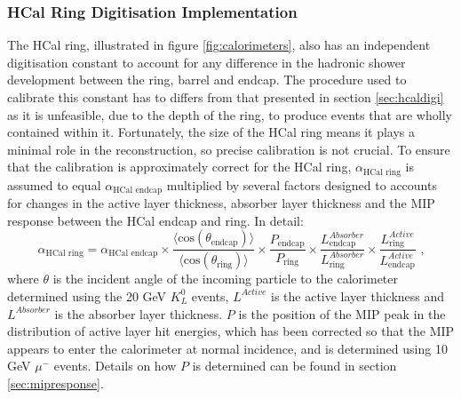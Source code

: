 \subsubsection{HCal Ring Digitisation Implementation}
\label{sec:hcalringdigi}
The HCal ring, illustrated in figure \ref{fig:calorimeters}, also has an independent digitisation constant to account for any difference in the hadronic shower development between the ring, barrel and endcap.  The procedure used to calibrate this constant has to differs from that presented in section \ref{sec:hcaldigi} as it is unfeasible, due to the depth of the ring, to produce events that are wholly contained within it.  Fortunately, the size of the HCal ring means it plays a minimal role in the reconstruction, so precise calibration is not crucial.  To ensure that the calibration is approximately correct for the HCal ring, $\alpha_{\text{HCal ring}}$ is assumed to equal $\alpha_{\text{HCal endcap}}$ multiplied by several factors designed to accounts for changes in the active layer thickness, absorber layer thickness and the MIP response between the HCal endcap and ring.  In detail:
%
\begin{equation}
\alpha_{\text{HCal ring}} = \alpha_{\text{HCal endcap}} \times \frac{\langle \text{cos}(\theta_\text{endcap}) \rangle}{\langle \text{cos}(\theta_\text{ring}) \rangle} \times \frac{P_\text{endcap} }{P_\text{ring} } \times \frac{L^{Absorber}_\text{endcap}}{L^{Absorber}_\text{ring} } \times \frac{L^{Active}_\text{ring}}{L^{Active}_\text{endcap}} \text{ ,}
\end{equation}
%
\noindent where $\theta$ is the incident angle of the incoming particle to the calorimeter determined using the 20 GeV $K^{0}_{L}$ events, $L^{Active}$ is the active layer thickness and $L^{Absorber}$ is the absorber layer thickness. $P$ is the position of the MIP peak in the distribution of active layer hit energies, which has been corrected so that the MIP appears to enter the calorimeter at normal incidence, and is determined using 10 GeV $\mu^{-}$ events.  Details on how $P$ is determined can be found in section \ref{sec:mipresponse}.

